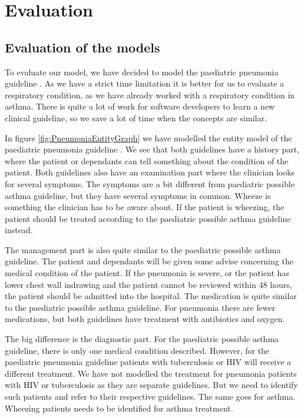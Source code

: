 \section{Evaluation}

\subsection{Evaluation of the models}
To evaluate our model, we have decided to model the paediatric pneumonia guideline \parencite{RepublicofKeny2016}. As we have a strict time limitation it is better for us to evaluate a respiratory condition, as we have already worked with a respiratory condition in asthma. There is quite a lot of work for software developers to learn a new clinical guideline, so we save a lot of time when the concepts are similar.

In figure \ref{fig:PneumoniaEntityGraph} we have modelled the entity model of the paediatric pneumonia guideline \parencite{RepublicofKeny2016}. We see that both guidelines have a history part, where the patient or dependants can tell something about the condition of the patient. Both guidelines also have an examination part where the clinician looks for several symptoms. The symptoms are a bit different from paediatric possible asthma guideline, but they have several symptoms in common. Wheeze is something the clinician has to be aware about. If the patient is wheezing, the patient should be treated according to the paediatric possible asthma guideline instead.

The management part is also quite similar to the paediatric possible asthma guideline. The patient and dependants will be given some advise concerning the medical condition of the patient. If the pneumonia is severe, or the patient has lower chest wall indrawing and the patient cannot be reviewed within 48 hours, the patient should be admitted into the hospital. The medication is quite similar to the paediatric possible asthma guideline. For pneumonia there are fewer medications, but both guidelines have treatment with antibiotics and oxygen.

The big difference is the diagnostic part. For the paediatric possible asthma guideline, there is only one medical condition described. However, for the paediatric pneumonia guideline patients with tuberculosis or HIV will receive a different treatment. We have not modelled the treatment for pneumonia patients with HIV or tuberculosis as they are separate guidelines. But we need to identify such patients and refer to their respective guidelines. The same goes for asthma. Wheezing patients needs to be identified for asthma treatment.

